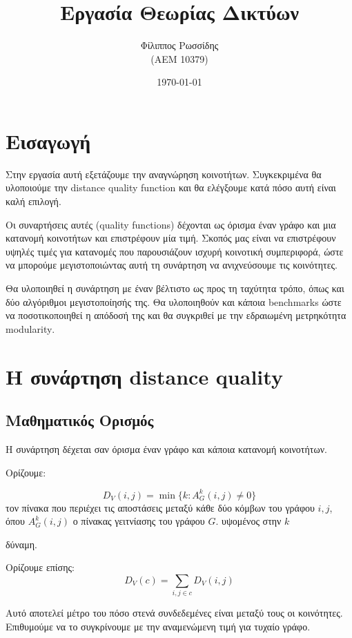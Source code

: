 \documentclass[10pt, letterpaper]{article}
\title{Εργασία Θεωρίας Δικτύων }
\author{Φίλιππος Ρωσσίδης \\ (ΑΕΜ 10379)}
\date{\today}
\begin{document}
\maketitle




\section{Εισαγωγή}

Στην εργασία αυτή εξετάζουμε την αναγνώρηση κοινοτήτων. Συγκεκριμένα θα 
υλοποιούμε την 
\textlatin{distance quality function} και θα ελέγξουμε κατά πόσο αυτή είναι καλή
επιλογή. 

Οι συναρτήσεις αυτές (\textlatin{quality functions}) δέχονται ως όρισμα έναν
γράφο και μια κατανομή κοινοτήτων και επιστρέφουν μία τιμή. Σκοπός μας είναι 
να επιστρέφουν υψηλές τιμές για κατανομές που παρουσιάζουν ισχυρή κοινοτική συμπεριφορά,
ώστε να μπορούμε μεγιστοποιώντας αυτή τη συνάρτηση να ανιχνεύσουμε τις κοινότητες.

Θα υλοποιηθεί η συνάρτηση με έναν βέλτιστο ως προς τη ταχύτητα τρόπο, όπως και δύο αλγόριθμοι μεγιστοποίησής της. Θα υλοποιηθούν 
και κάποια \textlatin{benchmarks} ώστε να ποσοτικοποιηθεί η απόδοσή της και θα συγκριθεί με την εδραιωμένη μετρηκότητα \textlatin{modularity}.


\section{Η συνάρτηση \textlatin{distance quality}}

\subsection{Μαθηματικός Ορισμός}

Η συνάρτηση δέχεται σαν όρισμα έναν γράφο και κάποια κατανομή κοινοτήτων.

Ορίζουμε:

\[ D_V(i,j) = \min \{ k:A^k_G (i,j) \neq 0 \} \]
τον πίνακα που περιέχει τις αποστάσεις μεταξύ κάθε δύο κόμβων του γράφου 
$i,j$, όπου $A^k_G(i,j)$ ο πίνακας γειτνίασης του γράφου $G$. υψομένος στην $k$

δύναμη. 

Ορίζουμε επίσης:
\[ D_V(c) = \sum_{i,j \in c} D_V(i,j) \]

Αυτό αποτελεί μέτρο του πόσο στενά συνδεδεμένες είναι μεταξύ τους 
οι κοινότητες. Επιθυμούμε να το συγκρίνουμε με την αναμενώμενη τιμή 
για τυχαίο γράφο.
\end{document}
